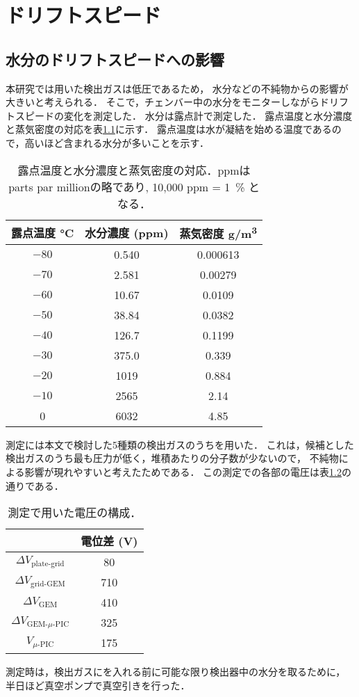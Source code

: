 \documentclass[../master]{subfiles}
\begin{document}
\chapter{ドリフトスピード}
\label{app::drift_speed_humid_dep}
\section{水分のドリフトスピードへの影響}
本研究では用いた検出ガスは低圧であるため，
水分などの不純物からの影響が大きいと考えられる．
そこで，チェンバー中の水分をモニターしながらドリフトスピードの変化を測定した．
水分は露点計で測定した．
露点温度と水分濃度と蒸気密度の対応を表\ref{tab::dew_point_humidity}に示す．
露点温度は水が凝結を始める温度であるので，高いほど含まれる水分が多いことを示す．
\begin{table}
  \centering
  \caption{露点温度と水分濃度と蒸気密度の対応．ppmはparts par millionの略であり, 10,000 ppm = \SI{1}{\percent} となる．}
  \label{tab::dew_point_humidity}
  \begin{tabular}{ccc}
    \toprule
    露点温度 \si{\degreeCelsius} & 水分濃度 (ppm) & 蒸気密度 \si{\gram/\cubic\metre} \\
    \midrule
    $-80$ & 0.540 & 0.000613 \\
    $-70$ & 2.581 & 0.00279 \\
    $-60$ & 10.67 & 0.0109 \\
    $-50$ & 38.84 & 0.0382 \\
    $-40$ & 126.7 & 0.1199 \\
    $-30$ & 375.0 & 0.339 \\
    $-20$ & 1019 & 0.884 \\
    $-10$ & 2565 & 2.14 \\
    0     & 6032 & 4.85 \\
    \bottomrule
  \end{tabular}
\end{table}
測定には本文で検討した5種類の検出ガスのうち\Methane を用いた．
これは，候補とした検出ガスのうち最も圧力が低く，堆積あたりの分子数が少ないので，
不純物による影響が現れやすいと考えたためである．
この測定での各部の電圧は表\ref{tab::configuration_for_drift_dep}の通りである．
\begin{table}
  \centering
  \caption{測定で用いた電圧の構成．}
  \label{tab::configuration_for_drift_dep}
  \begin{tabular}{cc}
    \toprule
    & 電位差 (\si{\volt}) \\
    \midrule
    $\Delta V_{\text{plate-grid}}$ & 80 \\
    $\Delta V_{\text{grid-GEM}}$ & 710 \\
    $\Delta V_{\text{GEM}}$ & 410 \\
    $\Delta V_{\text{GEM-}\mu\text{-PIC}}$ & 325 \\
    $V_{\mu\text{-PIC}}$ & 175 \\
    \bottomrule
  \end{tabular}
\end{table}
測定時は，検出ガスにを入れる前に可能な限り検出器中の水分を取るために，
半日ほど真空ポンプで真空引きを行った．
\end{document}
